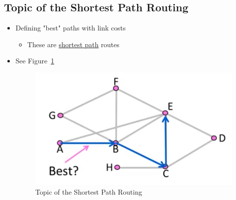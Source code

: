 \documentclass[12pt]{ctexart}   %
\begin{document}
	\subsection{Topic of the Shortest Path Routing}
	\begin{itemize}
		\item Defining "best" paths with link costs
		\begin{itemize}
			\item These are \underline{shortest path} routes
		\end{itemize}
		\item See Figure~\ref{fig:5-2-1}
		
		\begin{figure}[h!] %
		\centering
		 \includegraphics[scale=0.7]{images/5-2-1}
		\caption{ Topic of the Shortest Path Routing }
		 \label{fig:5-2-1}
		 \end{figure}
	\end{itemize}
	
\end{document}
